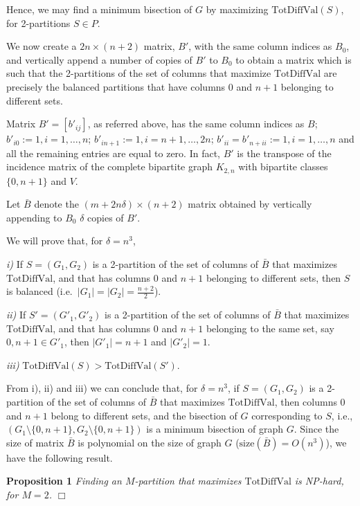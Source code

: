 Hence, we may find a minimum bisection of \(G\) by maximizing \(\mathrm{TotDiffVal}(S)\), for 2-partitions \(S\in P\).

We now create a \(2n\times (n+2)\) matrix, \(B'\), with the same column indices as \(B_{0}\), and vertically append a number of copies of \(B'\) to \(B_0\) to obtain a matrix which is such that the 2-partitions of the set of columns that maximize \(\mathrm{TotDiffVal}\) are precisely the balanced partitions that have columns \(0\) and \(n+1\) belonging to different sets.

Matrix \(B'=[b'_{ij}]\), as referred above, has the same column indices as \(B\); \(b'_{i 0}:=1, i=1,\dots,n\); \(b'_{i n+1}:=1, i=n+1,\dots,2n\); \(b'_{i i} = b'_{n+i i}:=1, i=1,\dots, n\) and all the remaining entries are equal to zero. In fact, \(B'\) is the transpose of the incidence matrix of the complete bipartite graph \(K_{2,n}\) with bipartite classes \(\{0,n+1\}\) and \(V.\)

Let \(\bar{B}\) denote the \((m+ 2n \delta) \times (n+2)\) matrix obtained by vertically appending to \(B_0\) \(\delta\) copies of \(B'\).

We will prove that, for \(\delta = n^3\),

\emph{i)} If \(S = (G_1, G_2)\) is a 2-partition of the set of columns of \(\bar{B}\) that maximizes \(\mathrm{TotDiffVal}\), and that has columns \(0\) and \(n+1\) belonging to different sets, then \(S\) is balanced (i.e.~\(|G_1| = |G_2| = \frac{n+2}{2}\)).

\emph{ii)} If \(S' = (G'_1, G'_2)\) is a 2-partition of the set of columns of \(\bar{B}\) that maximizes \(\mathrm{TotDiffVal}\), and that has columns \(0\) and \(n+1\) belonging to the same set, say \(0, n+1 \in G'_1\), then \(|G'_1| = n+1\) and \(|G'_2| = 1\).

\emph{iii)} \(\mathrm{TotDiffVal}(S) > \mathrm{TotDiffVal}(S')\).

From i), ii) and iii) we can conclude that, for \(\delta = n^3\), if \(S=(G_1,G_2)\) is a 2-partition of the set of columns of \(\bar{B}\) that maximizes \(\mathrm{TotDiffVal}\), then columns \(0\) and \(n+1\) belong to different sets, and the bisection of \(G\) corresponding to \(S\), i.e., \((G_1\setminus\{0,n+1\}, G_2\setminus\{0,n+1\})\) is a minimum bisection of graph \(G\). Since the size of matrix \(\bar{B}\) is polynomial on the size of graph \(G\) (\(\mathrm{size}(\bar{B}) = O(n^3)\)), we have the following result.

\textbf{Proposition 1} \emph{Finding an \(M\)-partition that maximizes \(\mathrm{TotDiffVal}\) is NP-hard, for \(M = 2\). \(\Box\)}

